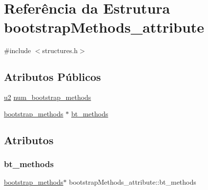 \hypertarget{structbootstrapMethods__attribute}{}\section{Referência da Estrutura bootstrap\+Methods\+\_\+attribute}
\label{structbootstrapMethods__attribute}


{\ttfamily \#include $<$structures.\+h$>$}

\subsection*{Atributos Públicos}
\begin{DoxyCompactItemize}
\item 
\hyperlink{lista__operandos_8h_a732cde1300aafb73b0ea6c2558a7a54f}{u2} \hyperlink{structbootstrapMethods__attribute_aad5dc2c56be879fe48451587b71c6715}{num\+\_\+bootstrap\+\_\+methods}
\item 
\hyperlink{structbootstrap__methods}{bootstrap\+\_\+methods} $\ast$ \hyperlink{structbootstrapMethods__attribute_a602dcc74faa430494a9c300edf2a74c3}{bt\+\_\+methods}
\end{DoxyCompactItemize}


\subsection{Atributos}
\mbox{\label{structbootstrapMethods__attribute_a602dcc74faa430494a9c300edf2a74c3}} 
\subsubsection{\texorpdfstring{bt\+\_\+methods}{bt\_methods}}
{\footnotesize\ttfamily \hyperlink{structbootstrap__methods}{bootstrap\+\_\+methods}$\ast$ bootstrap\+Methods\+\_\+attribute\+::bt\+\_\+methods}

\mbox{\label{structbootstrapMethods__attribute_aad5dc2c56be879fe48451587b71c6715}} 
